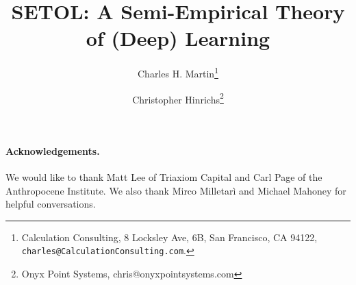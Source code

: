 \documentclass[11pt]{article}
\begin{document}
\title{%
SETOL: A Semi-Empirical Theory of (Deep) Learning
}

\author{%
Charles H. Martin\thanks{Calculation Consulting, 8 Locksley Ave, 6B, San Francisco, CA 94122, \texttt{charles@CalculationConsulting.com}.} 
\and
Christopher Hinrichs\thanks{Onyx Point Systems, chris@onyxpointsystems.com}
}

\date{}
\maketitle

\begin{abstract}

\end{abstract}

\newpage
\tableofcontents


\newpage

\newpage

\newpage

\newpage

\newpage

\newpage

\newpage



\noindent
\paragraph{Acknowledgements.}
We would like to thank Matt Lee of Triaxiom Capital and Carl Page of the Anthropocene Institute.
We also thank Mirco Milletarì and Michael Mahoney for helpful conversations.



%
{\small
%

%
}


\appendix


\end{document}
